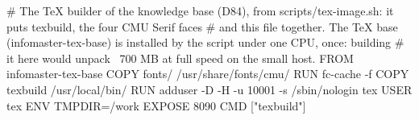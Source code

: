 # The TeX builder of the knowledge base (D84), from scripts/tex-image.sh: it puts texbuild, the four CMU Serif faces
# and this file together. The TeX base (infomaster-tex-base) is installed by the script under one CPU, once: building
# it here would unpack ~700 MB at full speed on the small host.
FROM infomaster-tex-base
COPY fonts/ /usr/share/fonts/cmu/
RUN fc-cache -f
COPY texbuild /usr/local/bin/
RUN adduser -D -H -u 10001 -s /sbin/nologin tex
USER tex
ENV TMPDIR=/work
EXPOSE 8090
CMD ["texbuild"]
